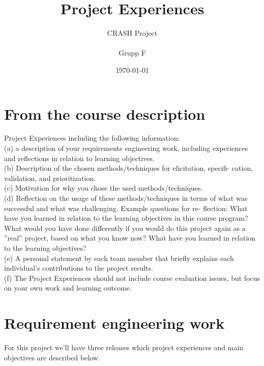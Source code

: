 \documentclass[10pt]{article}
\title{Project Experiences}
\author{CRASH Project
\\
\\ Grupp F}
\date{}
\begin{document}
\date{\today}
\begin{titlepage}
\clearpage
  \maketitle
\thispagestyle{empty}

\end{titlepage}


\tableofcontents
\thispagestyle{empty}
\newpage
{}

\section{From the course description}
\sloppy
\noindent
Project Experiences including the following information:
\\(a) a description of your requirements engineering work, including experiences
and reflections in relation to learning objectives.
\\(b) Description of the chosen methods/techniques for elicitation, specifi-
cation, validation, and prioritization.
\\(c) Motivation for why you chose the used methods/techniques.
\\(d) Reflection on the usage of these methods/techniques in terms of what
was successful and what was challenging. Example questions for re-
flection: What have you learned in relation to the learning objectives
in this course program? What would you have done differently if you
would do this project again as a ”real” project, based on what you know
now? What have you learned in relation to the learning objectives?
\\(e) A personal statement by each team member that briefly explains each
individual’s contributions to the project results.
\\(f) The Project Experiences should not include course evaluation issues,
but focus on your own work and learning outcome.
\newline

\section{Requirement engineering work}
\noindent For this project we'll have three releases which project experiences and main objectives are described below.
\end{document}
